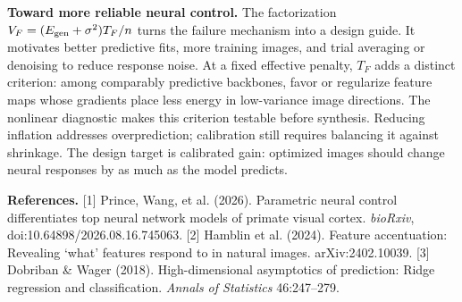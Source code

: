 \documentclass[12pt,a4paper]{article}
\newcommand{\head}[1]{\par\noindent\textbf{#1}\enspace\ignorespaces}
\begin{document}
\head{Toward more reliable neural control.}
The factorization $V_F=(E_{\rm gen}+\sigma^2)T_F/n$ turns the failure mechanism into a design guide. It motivates better predictive fits, more training images, and trial averaging or denoising to reduce response noise. At a fixed effective penalty, $T_F$ adds a distinct criterion: among comparably predictive backbones, favor or regularize feature maps whose gradients place less energy in low-variance image directions. The nonlinear diagnostic makes this criterion testable before synthesis. Reducing inflation addresses overprediction; calibration still requires balancing it against shrinkage. The design target is calibrated gain: optimized images should change neural responses by as much as the model predicts.

\vspace{2pt}
{\fontsize{10}{11}\selectfont
\textbf{References.}
[1] Prince, Wang, et al. (2026). Parametric neural control differentiates top neural network models of primate visual cortex. \emph{bioRxiv}, doi:10.64898/2026.08.16.745063.
[2] Hamblin et al. (2024). Feature accentuation: Revealing `what' features respond to in natural images. arXiv:2402.10039.
[3] Dobriban \& Wager (2018). High-dimensional asymptotics of prediction: Ridge regression and classification. \emph{Annals of Statistics} 46:247--279.
\par}
\end{document}
